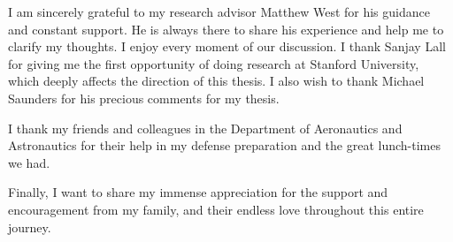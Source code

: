 %
%
I am sincerely grateful to my research advisor Matthew West for his guidance and constant support. He is always there to share his experience and help me to clarify my thoughts. I enjoy every moment of our discussion. 
I thank Sanjay Lall for giving me the first opportunity of doing research at Stanford University, which deeply affects the direction of this thesis. I also wish to thank Michael Saunders for his precious comments for my thesis. 

I thank my friends and colleagues in the Department of Aeronautics and Astronautics for their help in my defense preparation and the great lunch-times we had.

Finally, I want to share my immense appreciation for the support and encouragement from my family, and their endless love throughout this entire journey.
